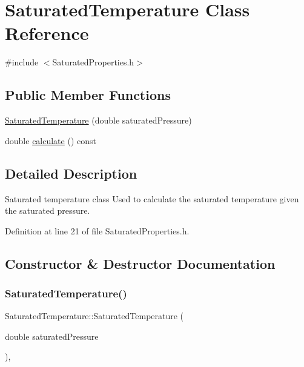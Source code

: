 \hypertarget{class_saturated_temperature}{}\section{Saturated\+Temperature Class Reference}
\label{class_saturated_temperature}


{\ttfamily \#include $<$Saturated\+Properties.\+h$>$}

\subsection*{Public Member Functions}
\begin{DoxyCompactItemize}
\item 
\hyperlink{class_saturated_temperature_ae0a4b1684a756ac8f91d3ebb646d6865}{Saturated\+Temperature} (double saturated\+Pressure)
\item 
double \hyperlink{class_saturated_temperature_a4aa0d2a337289dd36f4e063f1f67aaa5}{calculate} () const
\end{DoxyCompactItemize}


\subsection{Detailed Description}
Saturated temperature class Used to calculate the saturated temperature given the saturated pressure. 

Definition at line 21 of file Saturated\+Properties.\+h.



\subsection{Constructor \& Destructor Documentation}
\mbox{\label{class_saturated_temperature_ae0a4b1684a756ac8f91d3ebb646d6865}} 
\subsubsection{\texorpdfstring{Saturated\+Temperature()}{SaturatedTemperature()}}
{\footnotesize\ttfamily Saturated\+Temperature\+::\+Saturated\+Temperature (\begin{DoxyParamCaption}\item[{double}]{saturated\+Pressure }\end{DoxyParamCaption})\hspace{0.3cm}{\ttfamily [inline]}, {\ttfamily [explicit]}}

